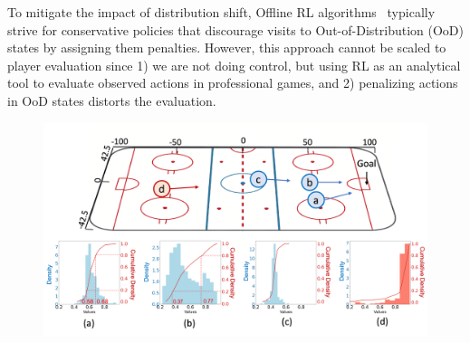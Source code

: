 \documentclass{article}
\begin{document}
To mitigate the impact of distribution shift, Offline RL algorithms~\cite{Levine2020OfflineRL} typically strive for conservative policies that discourage visits to Out-of-Distribution (OoD) states by assigning them penalties. However, this approach cannot be scaled to player evaluation since 1) we are not doing control, but using RL as an analytical tool to evaluate observed actions in professional games, and 2) penalizing actions in OoD states distorts the evaluation.


\begin{figure}
    \centering
    \includegraphics[scale=0.15]{figures/ice-hockey-rink-marked.png}

\end{figure}
\end{document}
